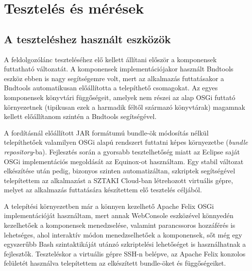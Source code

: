 \chapter{Tesztelés és mérések}
\label{cha:test}

\section{A teszteléshez használt eszközök}
\label{sec:testtools}

A feldolgozólánc teszteléséhez elő kellett állítani először a komponensek futtatható változatát. A komponensek implementációjakor használt Bndtools eszköz ebben is nagy segítségemre volt, mert az alkalmazás futtatásakor a Bndtools automatikusan előállította a telepíthető csomagokat. Az egyes komponensek könyvtári függőségeit, amelyek nem részei az alap OSGi futtató környezetnek (tipikusan ezek a harmadik féltől származó könyvtárak) magamnak kellett előállítanom szintén a Bndtools segítségével.

A fordításnál előállított JAR formátumú bundle-ök módosítás nélkül telepíthetőek valamilyen OSGi alapú rendszert futtatni képes környezetbe (\textit{bundle repository}-ba). Fejlesztés során a gyorsabb tesztelhetőség miatt az Eclipse saját OSGi implementációs megoldását az Equinox-ot használtam. Egy stabil változat elkészítése után pedig, bizonyos szinten automatizáltan, szkriptek segítségével telepítettem az alkalmazást a SZTAKI Cloud-ban létrehozott virtuális gépre, melyet az alkalmazás futtatására készítettem elő tesztelés céljából.

A telepítési környezetben már a könnyen kezelhető Apache Felix \cite{apachefelix} OSGi implementációját használtam, mert annak WebConsole eszközével könnyedén kezelhetőek a komponensek menedzselése, valamint parancssoros hozzáférés is lehetséges, ahol interaktív módon menedzselhetőek a komponensek, sőt még egy egyszerűbb Bash szintaktikáját utánzó szkriptelési lehetőséget is használhatnak a fejlesztők. Teszteléskor a virtuális gépre SSH-n belépve, az Apache Felix konzolos felületét használva telepítettem az elkészített bundle-öket és függőségeiket.

